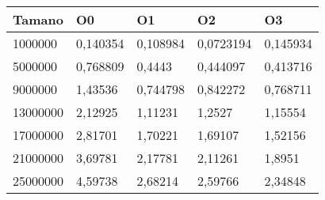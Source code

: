 \begin{tabular}{|l|l|l|l|l|}
	\hline
	Tamano & O0 & O1 & O2 & O3 \\
	\hline
	\hline
	1000000 & 0,140354 & 0,108984 & 0,0723194 & 0,145934 \\
	\hline
	5000000 & 0,768809 & 0,4443 & 0,444097 & 0,413716 \\
	\hline
	9000000 & 1,43536 & 0,744798 & 0,842272 & 0,768711 \\
	\hline
	13000000 & 2,12925 & 1,11231 & 1,2527 & 1,15554 \\
	\hline
	17000000 & 2,81701 & 1,70221 & 1,69107 & 1,52156 \\
	\hline
	21000000 & 3,69781 & 2,17781 & 2,11261 & 1,8951 \\
	\hline
	25000000 & 4,59738 & 2,68214 & 2,59766 & 2,34848 \\
	\hline
\end{tabular}
